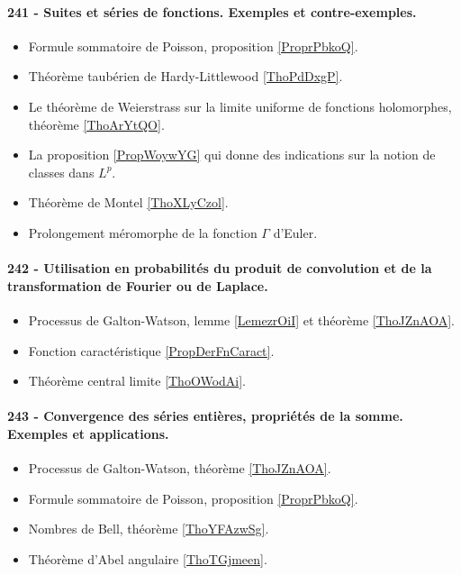 \paragraph{241 - Suites et séries de fonctions. Exemples et contre-exemples.}
\begin{itemize}
    \item Formule sommatoire de Poisson, proposition \ref{ProprPbkoQ}.
    \item Théorème taubérien de Hardy-Littlewood \ref{ThoPdDxgP}.
    \item Le théorème de Weierstrass sur la limite uniforme de fonctions holomorphes, théorème \ref{ThoArYtQO}.
    \item La proposition \ref{PropWoywYG} qui donne des indications sur la notion de classes dans \( L^p\).
    \item Théorème de Montel \ref{ThoXLyCzol}.
    \item Prolongement méromorphe de la fonction \( \Gamma\) d'Euler.
\end{itemize}
\paragraph{242 - Utilisation en probabilités du produit de convolution et de la transformation de Fourier ou de Laplace.}
\begin{itemize}
    \item Processus de Galton-Watson, lemme \ref{LemezrOiI} et théorème \ref{ThoJZnAOA}.
    \item Fonction caractéristique \ref{PropDerFnCaract}.
    \item Théorème central limite \ref{ThoOWodAi}.
\end{itemize}
\paragraph{243 - Convergence des séries entières, propriétés de la somme. Exemples et applications.}
\begin{itemize}
    \item Processus de Galton-Watson, théorème \ref{ThoJZnAOA}.
    \item Formule sommatoire de Poisson, proposition \ref{ProprPbkoQ}.
    \item Nombres de Bell, théorème \ref{ThoYFAzwSg}.
    \item Théorème d'Abel angulaire \ref{ThoTGjmeen}.
\end{itemize}
